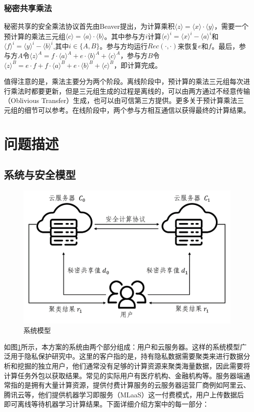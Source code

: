 \subsubsection{秘密共享乘法}
秘密共享的安全乘法协议首先由Beaver\cite{beaver1992efficient}提出，为计算乘积$\langle z\rangle=\langle x\rangle \cdot\langle y\rangle$，需要一个预计算的乘法三元组$\langle c\rangle=\langle a\rangle \cdot\langle b\rangle$。其中参与方$ i $计算$ \langle e \rangle^i = \langle x \rangle^i - \langle a \rangle^i $和$\langle f\rangle^i=\langle y\rangle^i-\langle b\rangle^i$,其中$ i \in \{A, B\}$。参与方均运行$ Rec(\cdot, \cdot) $来恢复$ e $和$ f $。最后，参与方$ A $令$\langle z\rangle^A=f \cdot\langle a\rangle^A+e \cdot\langle b\rangle^A+\langle c\rangle^A$，参与方$ B $令$\langle z\rangle^B=e \cdot f+f \cdot\langle a\rangle^B+e \cdot\langle b\rangle^B+\langle c\rangle^B$，即计算完成。

值得注意的是，乘法主要分为两个阶段。离线阶段中，预计算的乘法三元组每次进行乘法时都要更新，但是三元组生成的过程是离线的，可以由两方通过不经意传输（Oblivious Transfer）生成\cite{schneider2013gmw}，也可以由可信第三方提供\cite{riazi2018chameleon}。更多关于预计算乘法三元组的细节可以参考\cite{beaver1992efficient}。在线阶段中，两个参与方相互通信以获得最终的计算结果。
\section{问题描述}
\label{s3-wenti}

\subsection{系统与安全模型}
\begin{figure}[htbp]
	\centering
	\includegraphics[width=0.7\linewidth]{img/sysmodel1.png}%
	\caption{系统模型}
	\label{sys model}
\end{figure}

如图\ref{sys model}所示，本方案的系统由两个部分组成：用户和云服务器。这样的系统模型广泛用于隐私保护研究中\cite{wu2020secure,bunn2007secure}。这里的客户指的是，持有隐私数据需要聚类来进行数据分析和挖掘的独立用户，他们通常没有足够的计算资源来聚类海量数据，因此需要将计算任务外包以获取结果。常见的实际用户有医疗机构、金融机构等。服务器端通常指的是拥有大量计算资源，提供付费计算服务的云服务器运营厂商例如阿里云、腾讯云等，他们提供机器学习即服务（MLaaS）这一付费模式，用户上传数据后即可离线等待机器学习计算结果。下面详细介绍方案中的每一部分：

